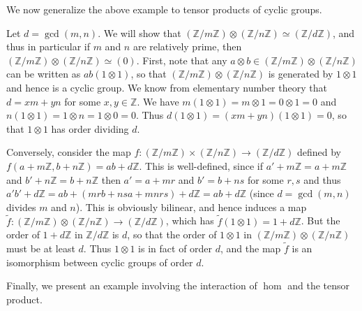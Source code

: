 We now generalize the above example to tensor products of cyclic groups.
\begin{example}
Let $d=\gcd(m,n)$. We will show that
$(\mathbb{Z}/m\mathbb{Z})\otimes(\mathbb{Z}/n\mathbb{Z})\simeq(\mathbb{Z}/d\mathbb{Z})$,
and thus in particular if $m$ and $n$
are relatively prime, then
$(\mathbb{Z}/m\mathbb{Z})\otimes(\mathbb{Z}/n\mathbb{Z})\simeq(0)$. First,
note that
any $a\otimes b\in(\mathbb{Z}/m\mathbb{Z})\otimes(\mathbb{Z}/n\mathbb{Z})$
can be written as $ab(1\otimes 1)$,
so that $(\mathbb{Z}/m\mathbb{Z})\otimes(\mathbb{Z}/n\mathbb{Z})$ is generated
by $1\otimes 1$ and hence
is a cyclic group. We know from elementary number theory that $d=xm+yn$
for some $x,y\in\mathbb{Z}$. We have $m(1\otimes 1)=m\otimes 1=0\otimes
1=0$ and
$n(1\otimes 1)=1\otimes n=1\otimes0=0$. Thus $d(1\otimes 1)=(xm+yn)(1\otimes
1)=0$, so that $1\otimes1$ has order dividing $d$.

Conversely, consider the map
$f:(\mathbb{Z}/m\mathbb{Z})\times(\mathbb{Z}/n\mathbb{Z})\rightarrow(\mathbb{Z}/d\mathbb{Z})$
defined by
$f(a+m\mathbb{Z},b+n\mathbb{Z})=ab+d\mathbb{Z}$. This is well-defined,
since if $a'+m\mathbb{Z}=a+m\mathbb{Z}$
and $b'+n\mathbb{Z}=b+n\mathbb{Z}$ then $a'=a+mr$ and $b'=b+ns$ for some
$r,s$ and
thus $a'b'+d\mathbb{Z}=ab+(mrb+nsa+mnrs)+d\mathbb{Z}=ab+d\mathbb{Z}$
(since $d=\gcd(m,n)$
divides $m$ and $n$). This is obviously bilinear, and hence induces a map
$\tilde{f}:(\mathbb{Z}/m\mathbb{Z})\otimes(\mathbb{Z}/n\mathbb{Z})\rightarrow(\mathbb{Z}/d\mathbb{Z})$,
which
has $\tilde{f}(1\otimes1)=1+d\mathbb{Z}$. But the order of $1+d\mathbb{Z}$
in $\mathbb{Z}/d\mathbb{Z}$ is $d$, so that the order of $1\otimes1$ in
$(\mathbb{Z}/m\mathbb{Z})\otimes(\mathbb{Z}/n\mathbb{Z})$ must be at least
$d$. Thus $1\otimes1$ is in fact
of order $d$, and the map $\tilde{f}$ is an isomorphism between cyclic groups
of order $d$.
\end{example}

Finally, we present an example involving the interaction of $\hom$ and the
tensor product.

